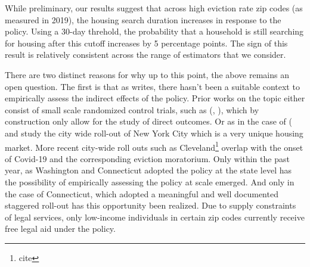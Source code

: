 \documentclass[a4paper,12pt]{article}
\begin{document}
While preliminary, our results suggest that across high eviction rate zip codes (as measured in 2019), the housing search duration increases in response to the policy. Using a 30-day threhold, the probability that a household is still searching for housing after this cutoff increases by 5 percentage points. The sign of this result is relatively consistent across the range of estimators that we consider. 

There are two distinct reasons for why up to this point, the above remains an open question. The first is that as \cite{abramson2021welfare} writes, there hasn't been a suitable context to empirically assess the indirect effects of the policy. Prior works on the topic either consist of small scale randomized control trials, such as (\cite{greiner2012limits}, \cite{seron2001impact}), which by construction only allow for the study of direct outcomes. Or as in the case of (\cite{cassidy2022effects} and \cite{ellen2021lawyers} study the city wide roll-out of New York City which is a very unique housing market. More recent city-wide roll outs such as Cleveland\footnote{cite} overlap with the onset of Covid-19 and the corresponding eviction moratorium. Only within the past year, as Washington and Connecticut adopted the policy at the state level has the possibility of empirically assessing the policy at scale emerged. And only in the case of Connecticut, which adopted a meaningful and well documented staggered roll-out has this opportunity been realized. Due to supply constraints of legal services, only low-income individuals in certain zip codes currently receive free legal aid under the policy.\par 
\end{document}
